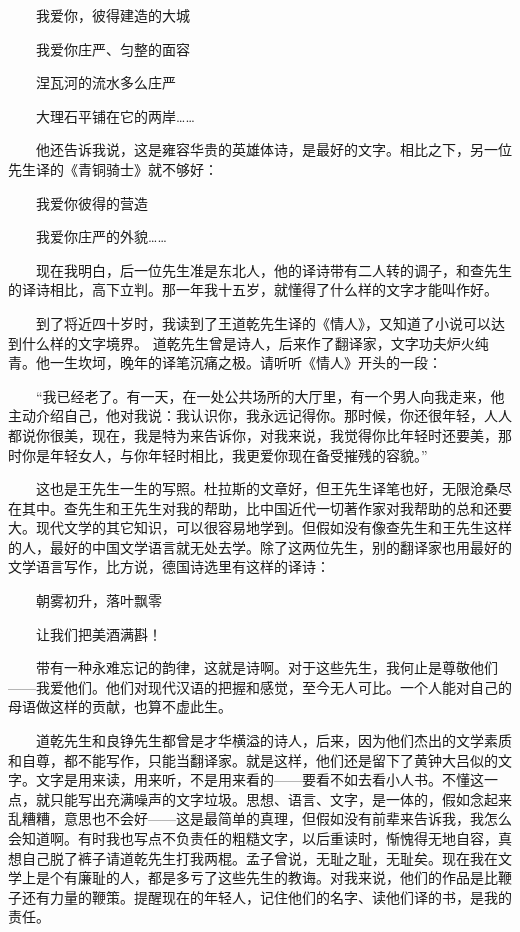 　　我爱你，彼得建造的大城　 

　　我爱你庄严、匀整的面容　 

　　涅瓦河的流水多么庄严　 

　　大理石平铺在它的两岸……　 

　　他还告诉我说，这是雍容华贵的英雄体诗，是最好的文字。相比之下，另一位先生译的《青铜骑士》就不够好： 

　　我爱你彼得的营造　 

　　我爱你庄严的外貌……　 

　　现在我明白，后一位先生准是东北人，他的译诗带有二人转的调子，和查先生的译诗相比，高下立判。那一年我十五岁，就懂得了什么样的文字才能叫作好。　 

　　到了将近四十岁时，我读到了王道乾先生译的《情人》，又知道了小说可以达到什么样的文字境界。 道乾先生曾是诗人，后来作了翻译家，文字功夫炉火纯青。他一生坎坷，晚年的译笔沉痛之极。请听听《情人》开头的一段：　 

　　“我已经老了。有一天，在一处公共场所的大厅里，有一个男人向我走来，他主动介绍自己，他对我说：我认识你，我永远记得你。那时候，你还很年轻，人人都说你很美，现在，我是特为来告诉你，对我来说，我觉得你比年轻时还要美，那时你是年轻女人，与你年轻时相比，我更爱你现在备受摧残的容貌。”　 

　　这也是王先生一生的写照。杜拉斯的文章好，但王先生译笔也好，无限沧桑尽在其中。查先生和王先生对我的帮助，比中国近代一切著作家对我帮助的总和还要大。现代文学的其它知识，可以很容易地学到。但假如没有像查先生和王先生这样的人，最好的中国文学语言就无处去学。除了这两位先生，别的翻译家也用最好的文学语言写作，比方说，德国诗选里有这样的译诗：　 

　　朝雾初升，落叶飘零 

　　让我们把美酒满斟！ 

　　带有一种永难忘记的韵律，这就是诗啊。对于这些先生，我何止是尊敬他们——我爱他们。他们对现代汉语的把握和感觉，至今无人可比。一个人能对自己的母语做这样的贡献，也算不虚此生。　 

　　道乾先生和良铮先生都曾是才华横溢的诗人，后来，因为他们杰出的文学素质和自尊，都不能写作，只能当翻译家。就是这样，他们还是留下了黄钟大吕似的文字。文字是用来读，用来听，不是用来看的——要看不如去看小人书。不懂这一点，就只能写出充满噪声的文字垃圾。思想、语言、文字，是一体的，假如念起来乱糟糟，意思也不会好——这是最简单的真理，但假如没有前辈来告诉我，我怎么会知道啊。有时我也写点不负责任的粗糙文字，以后重读时，惭愧得无地自容，真想自己脱了裤子请道乾先生打我两棍。孟子曾说，无耻之耻，无耻矣。现在我在文学上是个有廉耻的人，都是多亏了这些先生的教诲。对我来说，他们的作品是比鞭子还有力量的鞭策。提醒现在的年轻人，记住他们的名字、读他们译的书，是我的责任。　 

